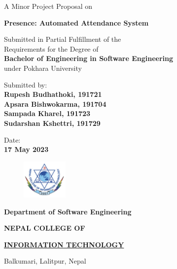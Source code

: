\documentclass[a4paper 14pt]{article}
\begin{document}
\begin{titlepage}
	\begin{center}
	
	\large%
	A Minor Project Proposal on
	
	\huge %
	\textbf{Presence: Automated Attendance System}

	\vfill
	
	\large %
	Submitted in Partial Fulfillment of the \\ 
	Requirements for the Degree of \\ 
	\textbf {Bachelor of Engineering in Software Engineering} \\
	under Pokhara University
	
	\vfill
	
	Submitted by: \\ 
	\textbf {Rupesh Budhathoki, 191721} \\
	\textbf {Apsara Bishwokarma, 191704} \\
	\textbf {Sampada Kharel, 191723} \\
	\textbf {Sudarshan Kshettri, 191729} \\
 
	\vfill
	
	
	
	Date: \\
	\textbf {17 May 2023}
	
	\vfill
	
	\end{center}
	
	\begin{figure}
	\centering
	\includegraphics[width=0.2\textwidth]{figures/college-logo.png}
	\end{figure}
	
	\selectfont
	
	\textbf {Department of Software Engineering}  
	
        \LARGE %
	\textbf {NEPAL COLLEGE OF} 
	
	\LARGE %
	\textbf {\underline {INFORMATION TECHNOLOGY} }
	
	\small %
	Balkumari, Lalitpur, Nepal
	
	
\end{titlepage}
\end{document}
